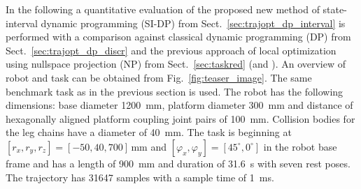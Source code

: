 \documentclass[runningheads]{llncs}
\begin{document}
In the following a quantitative evaluation of the proposed new method of state-interval dynamic programming (SI-DP) from Sect.~\ref{sec:trajopt_dp_interval} is performed with a comparison against classical dynamic programming (DP) from Sect.~\ref{sec:trajopt_dp_discr} and the previous approach of local optimization using nullspace projection (NP) from Sect.~\ref{sec:taskred} (and \cite{SchapplerOrt2021}).
An overview of robot and task can be obtained from Fig.~\ref{fig:teaser_image}.
The same benchmark task as in the previous section is used.
The robot has the following dimensions: base diameter \SI{1200}{\milli\metre}, platform diameter \SI{300}{\milli\metre} and distance of hexagonally aligned platform coupling joint pairs of \SI{100}{\milli\metre}.
Collision bodies for the leg chains have a diameter of \SI{40}{\milli\metre}.
The task is beginning at $[r_x, r_y, r_z]=[-50, 40, 700]$\,mm and $[\varphi_x, \varphi_y]=[45^\circ,0^\circ]$ in the robot base frame and has a length of \SI{900}{\milli\metre} and duration of \SI{31.6}{\second} with seven rest poses.
The trajectory has 31647 samples with a sample time of \SI{1}{\milli\second}. 
\end{document}
